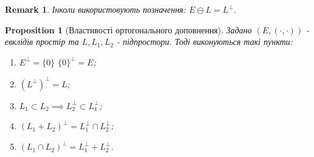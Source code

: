 \documentclass[a4paper, 10pt]{article}
\theoremstyle{theoremdd}
\newtheorem{proposition}[theorem]{Proposition}
\newtheorem{remark}[theorem]{Remark}
\begin{document}
\begin{remark}
Інколи використовують позначення: $E \ominus L = L^{\perp}$.
\end{remark}

\begin{proposition}[Властивості ортогонального доповнення]
Задано $(E,(\cdot,\cdot))$ - евклідів простір та $L,L_1,L_2$ - підпростори. Тоді виконуються такі пункти:
\begin{enumerate}[nosep, wide=0pt, label={\arabic*)}]
\item $E^{\perp} = \{0\}$ \qquad $\{0\}^{\perp} = E$;
\item $(L^{\perp})^{\perp} = L$;
\item $L_1 \subset L_2 \implies L_2^{\perp} \subset L_1^{\perp}$;
\item $(L_1+L_2)^{\perp} = L_1^{\perp} \cap L_2^{\perp}$;
\item $(L_1 \cap L_2)^{\perp} = L_1^{\perp} + L_2^{\perp}$.
\end{enumerate}
\end{proposition}
\end{document}
